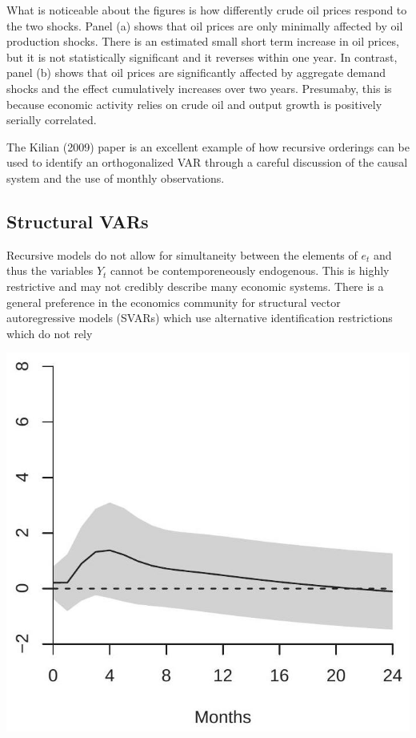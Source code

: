 \documentclass[10pt]{article}
\begin{document}
What is noticeable about the figures is how differently crude oil prices respond to the two shocks. Panel (a) shows that oil prices are only minimally affected by oil production shocks. There is an estimated small short term increase in oil prices, but it is not statistically significant and it reverses within one year. In contrast, panel (b) shows that oil prices are significantly affected by aggregate demand shocks and the effect cumulatively increases over two years. Presumaby, this is because economic activity relies on crude oil and output growth is positively serially correlated.

The Kilian (2009) paper is an excellent example of how recursive orderings can be used to identify an orthogonalized VAR through a careful discussion of the causal system and the use of monthly observations.

\subsection{Structural VARs}
Recursive models do not allow for simultaneity between the elements of $e_{t}$ and thus the variables $Y_{t}$ cannot be contemporeneously endogenous. This is highly restrictive and may not credibly describe many economic systems. There is a general preference in the economics community for structural vector autoregressive models (SVARs) which use alternative identification restrictions which do not rely

\includegraphics[max width=\textwidth]{2022_10_23_7c0e31a459390f548ae3g-23}
\end{document}

